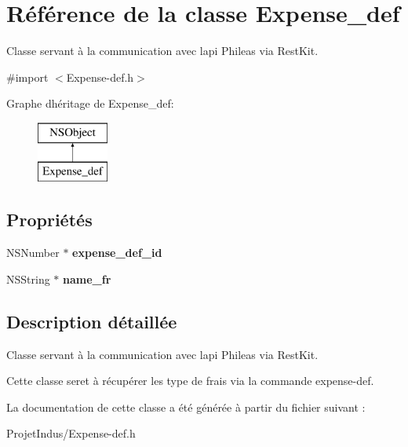 \hypertarget{interface_expense__def}{}\section{Référence de la classe Expense\+\_\+def}
\label{interface_expense__def}


Classe servant à la communication avec l\textquotesingle{}api Phileas via Rest\+Kit.  




{\ttfamily \#import $<$Expense-\/def.\+h$>$}

Graphe d\textquotesingle{}héritage de Expense\+\_\+def\+:\begin{figure}[H]
\begin{center}
\leavevmode
\includegraphics[height=2.000000cm]{interface_expense__def}
\end{center}
\end{figure}
\subsection*{Propriétés}
\begin{DoxyCompactItemize}
\item 
\hypertarget{interface_expense__def_a6406aa23f0fe6a9db87390734c428e96}{}N\+S\+Number $\ast$ {\bfseries expense\+\_\+def\+\_\+id}\label{interface_expense__def_a6406aa23f0fe6a9db87390734c428e96}

\item 
\hypertarget{interface_expense__def_ab1e9ed95a75caef74a90f63e30f34b21}{}N\+S\+String $\ast$ {\bfseries name\+\_\+fr}\label{interface_expense__def_ab1e9ed95a75caef74a90f63e30f34b21}

\end{DoxyCompactItemize}


\subsection{Description détaillée}
Classe servant à la communication avec l\textquotesingle{}api Phileas via Rest\+Kit. 

Cette classe seret à récupérer les type de frais via la commande expense-\/def. 

La documentation de cette classe a été générée à partir du fichier suivant \+:\begin{DoxyCompactItemize}
\item 
Projet\+Indus/Expense-\/def.\+h\end{DoxyCompactItemize}
